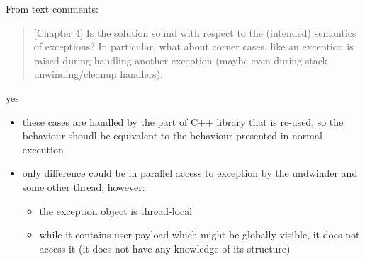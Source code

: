 \documentclass[aspectratio=169, fi]{paradise-slide}
\newcommand{\rquote}[1]{\begin{quote}#1\end{quote}\bigskip\setlength{\leftmargini}{1em}}
\begin{document}
\begin{frame}[noframenumbering]{\qtitle}
  From text comments:
  \rquote{[Chapter 4] Is the solution sound with respect to the (intended) semantics of exceptions? In
    particular, what about corner cases, like an exception is raised during handling another
    exception (maybe even during stack unwinding/cleanup handlers).}

  yes
  \begin{itemize}
    \item these cases are handled by the part of C++ library that is re-used, so the behaviour
      shoudl be equivalent to the behaviour presented in normal execution
    \item only difference could be in parallel access to exception by the undwinder and some other
      thread, however:
      \begin{itemize}
        \item the exception object is thread-local
        \item while it contains user payload which might be globally visible, it does not access it
          (it does not have any knowledge of its structure)
      \end{itemize}
  \end{itemize}
\end{frame}
\end{document}

